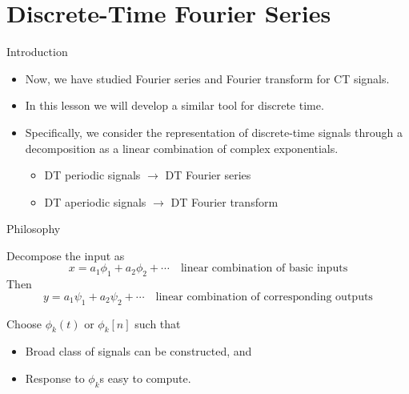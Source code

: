 \section{Discrete-Time Fourier Series}

\begin{frame}{Introduction}
    \begin{itemize}[<+->]
        \item Now, we have studied Fourier series and Fourier transform for CT signals.
        \item In this lesson we will develop a similar tool for discrete time.
        \item Specifically, we consider the representation of discrete-time signals through a decomposition as a linear combination of complex exponentials.
            \begin{itemize}
                \item DT periodic signals $\rightarrow$ DT Fourier series
                \item DT aperiodic signals $\rightarrow$ DT Fourier transform
            \end{itemize}
    \end{itemize}
\end{frame}


\begin{frame}{Philosophy}
        \begin{center}
        \end{center}
        Decompose the input as
            \begin{equation*}
                x = a_1\phi_1 + a_2\phi_2 + \cdots \quad \text{linear combination of basic inputs}
            \end{equation*}
        Then
            \begin{equation*}
                y = a_1\psi_1 + a_2\psi_2 + \cdots \quad \text{linear combination of corresponding outputs}
            \end{equation*}

        Choose $\phi_k(t)$ or $\phi_k[n]$ such that
        \begin{itemize}
            \item Broad class of signals can be constructed, and
            \item Response to $\phi_k$s easy to compute.
        \end{itemize}
\end{frame}

